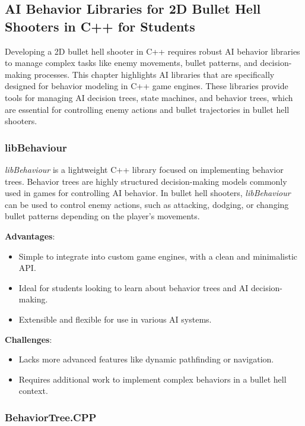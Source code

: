 \subsection{AI Behavior Libraries for 2D Bullet Hell Shooters in C++ for Students}

Developing a 2D bullet hell shooter in C++ requires robust AI behavior libraries to manage complex tasks like enemy movements, bullet patterns, and decision-making processes. This chapter highlights AI libraries that are specifically designed for behavior modeling in C++ game engines. These libraries provide tools for managing AI decision trees, state machines, and behavior trees, which are essential for controlling enemy actions and bullet trajectories in bullet hell shooters.

\subsubsection{libBehaviour}

\textit{libBehaviour} is a lightweight C++ library focused on implementing behavior trees. Behavior trees are highly structured decision-making models commonly used in games for controlling AI behavior. In bullet hell shooters, \textit{libBehaviour} can be used to control enemy actions, such as attacking, dodging, or changing bullet patterns depending on the player’s movements.

\textbf{Advantages}:
\begin{itemize}
    \item Simple to integrate into custom game engines, with a clean and minimalistic API.
    \item Ideal for students looking to learn about behavior trees and AI decision-making.
    \item Extensible and flexible for use in various AI systems.
\end{itemize}

\textbf{Challenges}:
\begin{itemize}
    \item Lacks more advanced features like dynamic pathfinding or navigation.
    \item Requires additional work to implement complex behaviors in a bullet hell context.
\end{itemize}

\subsubsection{BehaviorTree.CPP}

